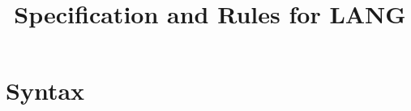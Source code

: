 \documentclass{article}
\title{Specification and Rules for LANG}
\def\code#1{\texttt{#1}}
\def\por{\ | \ }
\def\binop{\ \text{\textbullet}\ }
\begin{document}
\maketitle
\section*{Syntax}

%
\end{document}
